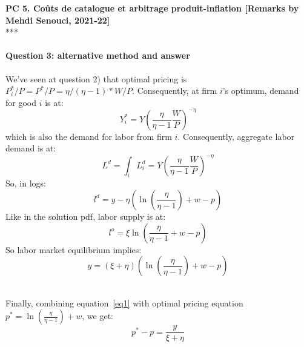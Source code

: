 \documentclass[a4paper]{article}
\begin{document}
\large


\begin{center}
	\textbf{\Large PC 5. Coûts de catalogue et arbitrage produit-inflation [Remarks by Mehdi Senouci, 2021-22]}\\
	\vspace{1em}
	***\\
\end{center}

\paragraph{Question 3: alternative method and answer}

We've seen at question 2) that optimal pricing is $P_i^*/P=P^*/P=\eta/(\eta-1)*W/P$. Consequently, at firm $i$'s optimum, demand for good $i$ is at:
\[
Y_i^* = Y \left( \frac{\eta}{\eta-1} \frac{W}{P}\right)^{-\eta}
\]
which is also the demand for labor from firm $i$. Consequently, aggregate labor demand is at:
\[
L^d=\int_i L_i^d = Y \left( \frac{\eta}{\eta-1} \frac{W}{P}\right)^{-\eta}
\]
So, in logs:
\[
l^d=y-\eta \left( \ln \left( \frac{\eta}{\eta-1}  \right)+w-p\right) 
\]
Like in the solution pdf, labor supply is at:
\[
l^o=\xi \ln \left( \frac{\eta}{\eta-1}  + w-p \right)
\]
So labor market equilibrium implies:
\begin{equation} \label{eq1}
y=(\xi+\eta) \left( \ln \left( \frac{\eta}{\eta-1} \right) +w-p \right)
\end{equation}~

Finally, combining equation~\eqref{eq1} with optimal pricing equation $p^*=\ln \left( \frac{\eta}{\eta-1} \right) +w$, we get:
\begin{equation} \label{eq2}
p^*-p=\frac{y}{\xi +\eta}
\end{equation}
\end{document}
